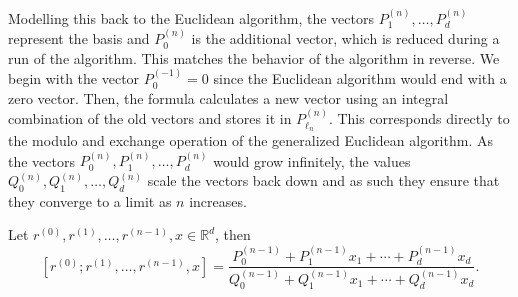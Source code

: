 Modelling this back to the Euclidean algorithm,
the vectors $P_1^{(n)}, …, P_d^{(n)}$ represent the basis and $P_0^{(n)}$ is
the additional vector, which is reduced during a run of the algorithm.
This matches the behavior of the algorithm in reverse.
We begin with the vector $P_0^{(-1)} = 0$ since the Euclidean algorithm
would end with a zero vector.
Then, the formula calculates a new vector using an integral combination of the
old vectors and stores it in $P_{ℓ_n}^{(n)}$.
This corresponds directly to the modulo and exchange operation of the
generalized Euclidean algorithm.
As the vectors $P_0^{(n)}, P_1^{(n)}, …, P_d^{(n)}$ would grow infinitely, the
values $Q_0^{(n)}, Q_1^{(n)}, …, Q_d^{(n)}$ scale the vectors back down and as
such they ensure that they converge to a limit as $n$ increases.

\begin{lemma}
  \label{lem:mdcf-wallis}
  Let $r^{(0)}, r^{(1)}, …, r^{(n-1)}, x ∈ ℝ^d$, then
  \[
    [r^{(0)}; r^{(1)}, …, r^{(n-1)}, x]
    = \frac{P_0^{(n-1)} + P_1^{(n-1)} x_1 + ⋯ + P_d^{(n-1)} x_d}{Q_0^{(n-1)} + Q_1^{(n-1)} x_1 + ⋯ + Q_d^{(n-1)} x_d}.
  \]
\end{lemma}

